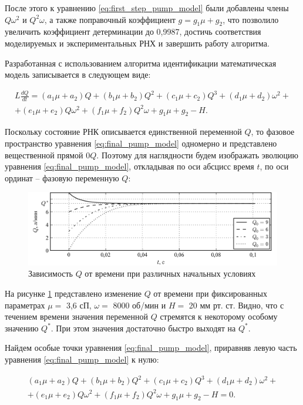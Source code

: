 После этого к уравнению \eqref{eq:first_step_pump_model} были добавлены члены $Q\omega^2$ и $Q^2 \omega$, а также поправочный коэффициент $g = g_1\mu +g_2$, что позволило увеличить коэффициент детерминации до 0,9987, достичь соответствия моделируемых и экспериментальных РНХ и завершить работу алгоритма.  

Разработанная с использованием алгоритма идентификации математическая модель записывается в следующем виде: 

\begin{multline}
 L\frac{dQ}{dt} = (a_1\mu+a_2)Q + (b_1\mu+b_2)Q^2 + (c_1\mu+c_2)Q^3 + (d_1\mu+d_2)\omega^2 + \\+ (e_1\mu+e_2)Q\omega^2 + (f_1\mu+f_2)Q^2\omega + g_1\mu+g_2 - H.
\label{eq:final_pump_model}
\end{multline}

Поскольку состояние РНК описывается единственной переменной $Q$, то фазовое пространство уравнения \eqref{eq:final_pump_model} одномерно и представлено вещественной прямой $0Q$. Поэтому для наглядности будем изображать эволюцию уравнения \eqref{eq:final_pump_model}, откладывая по оси абсцисс время $t$, по оси ординат -- фазовую переменную $Q$:

\begin{figure}[ht] 
  \center
  \includegraphics [scale=1.0] {../images/dynamic_model_solution_zero_abs}
  \caption{Зависимость $Q$ от времени при различных начальных условиях}
  \label{img:final_pump_model_solution_zero}  
\end{figure}

На рисунке \ref{img:final_pump_model_solution_zero} представлено изменение $Q$ от времени при фиксированных параметрах $\mu = $ 3,6 сП, $\omega =$ 8000 об/мин и $H = $ 20 мм рт. ст. Видно, что с течением времени значения переменной $Q$ стремятся к некоторому особому значению $Q^*$. При этом значения достаточно быстро выходят на $Q^*$. 

Найдем особые точки уравнения \eqref{eq:final_pump_model}, приравняв левую часть уравнения \eqref{eq:final_pump_model} к нулю:

\begin{multline}
(a_1\mu+a_2)Q + (b_1\mu+b_2)Q^2 + (c_1\mu+c_2)Q^3 + (d_1\mu+d_2)\omega^2 + \\+ (e_1\mu+e_2)Q\omega^2 + (f_1\mu+f_2)Q^2\omega + g_1\mu+g_2 - H = 0.
\label{eq:final_pump_model_zero}
\end{multline}

